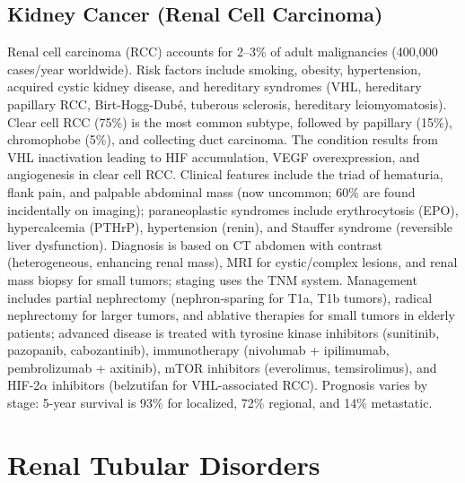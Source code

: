 \subsection{Kidney Cancer (Renal Cell Carcinoma)}
\label{sec:Kidney Cancer}
Renal cell carcinoma (RCC) accounts for 2--3\% of adult malignancies (400,000 cases/year worldwide). Risk factors include smoking, obesity, hypertension, acquired cystic kidney disease, and hereditary syndromes (VHL, hereditary papillary RCC, Birt-Hogg-Dubé, tuberous sclerosis, hereditary leiomyomatosis). Clear cell RCC (75\%) is the most common subtype, followed by papillary (15\%), chromophobe (5\%), and collecting duct carcinoma. The condition results from VHL inactivation leading to HIF accumulation, VEGF overexpression, and angiogenesis in clear cell RCC. Clinical features include the triad of hematuria, flank pain, and palpable abdominal mass (now uncommon; 60\% are found incidentally on imaging); paraneoplastic syndromes include erythrocytosis (EPO), hypercalcemia (PTHrP), hypertension (renin), and Stauffer syndrome (reversible liver dysfunction). Diagnosis is based on CT abdomen with contrast (heterogeneous, enhancing renal mass), MRI for cystic/complex lesions, and renal mass biopsy for small tumors; staging uses the TNM system. Management includes partial nephrectomy (nephron-sparing for T1a, T1b tumors), radical nephrectomy for larger tumors, and ablative therapies for small tumors in elderly patients; advanced disease is treated with tyrosine kinase inhibitors (sunitinib, pazopanib, cabozantinib), immunotherapy (nivolumab + ipilimumab, pembrolizumab + axitinib), mTOR inhibitors (everolimus, temsirolimus), and HIF-2$\alpha$ inhibitors (belzutifan for VHL-associated RCC). Prognosis varies by stage: 5-year survival is 93\% for localized, 72\% regional, and 14\% metastatic.

\section{Renal Tubular Disorders}





